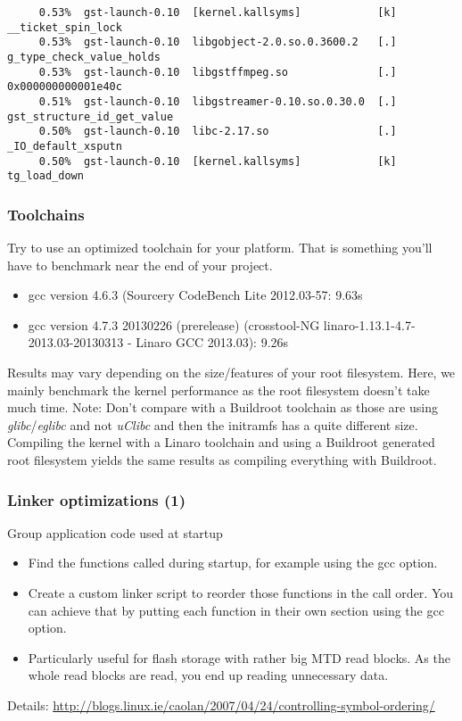 \begin{frame}[fragile]
\begin{block}{}
\begin{verbatim}
     0.53%  gst-launch-0.10  [kernel.kallsyms]            [k] __ticket_spin_lock                           
     0.53%  gst-launch-0.10  libgobject-2.0.so.0.3600.2   [.] g_type_check_value_holds                     
     0.53%  gst-launch-0.10  libgstffmpeg.so              [.] 0x000000000001e40c                           
     0.51%  gst-launch-0.10  libgstreamer-0.10.so.0.30.0  [.] gst_structure_id_get_value                   
     0.50%  gst-launch-0.10  libc-2.17.so                 [.] _IO_default_xsputn                           
     0.50%  gst-launch-0.10  [kernel.kallsyms]            [k] tg_load_down                                 
\end{verbatim}
\end{block}
\end{frame}

\begin{frame}
\frametitle{Toolchains}
Try to use an optimized toolchain for your platform. That is something
you'll have to benchmark near the end of your project.
\begin{itemize}
        \item gcc version 4.6.3 (Sourcery CodeBench Lite 2012.03-57: 9.63s
        \item gcc version 4.7.3 20130226 (prerelease) (crosstool-NG
        linaro-1.13.1-4.7-2013.03-20130313 - Linaro GCC 2013.03): 9.26s
\end{itemize}
Results may vary depending on the size/features of your root filesystem.
Here, we mainly benchmark the kernel performance as the root filesystem
doesn't take much time. Note: Don't compare with a Buildroot toolchain as
those are using {\em glibc}/{\em eglibc} and not {\em uClibc} and then
the initramfs has a quite different size. Compiling the kernel with a
Linaro toolchain and using a Buildroot generated root filesystem yields
the same results as compiling everything with Buildroot.
\end{frame}

\begin{frame}
\frametitle{Linker optimizations (1)}
Group application code used at startup
\begin{itemize}
        \item Find the functions called during startup, for example using
              the  gcc option.
        \item Create a custom linker script to reorder those functions in
              the call order. You can achieve that by putting each function
              in their own section using the  gcc
              option.
        \item Particularly useful for flash storage with rather big MTD
              read blocks. As the whole read blocks are read, you end up
              reading unnecessary data.
\end{itemize}
Details:
{\scriptsize
\url{http://blogs.linux.ie/caolan/2007/04/24/controlling-symbol-ordering/}}
\end{frame}

